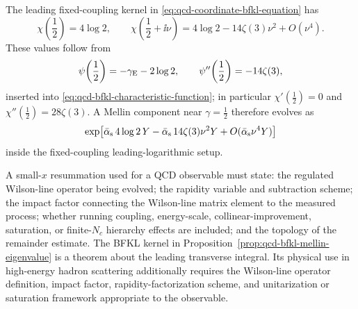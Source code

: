 The leading fixed-coupling kernel in
\eqref{eq:qcd-coordinate-bfkl-equation} has
\[
  \chi\!\left(\frac12\right)=4\log2,
  \qquad
  \chi\!\left(\frac12+\ii\nu\right)
  =
  4\log2-14\zeta(3)\nu^2+O(\nu^4).
\]
These values follow from
\[
  \psi\!\left(\frac12\right)=-\gamma_{\rm E}-2\log2,
  \qquad
  \psi''\!\left(\frac12\right)=-14\zeta(3),
\]
inserted into \eqref{eq:qcd-bfkl-characteristic-function}; in particular
\(\chi'(\frac12)=0\) and \(\chi''(\frac12)=28\zeta(3)\).  A Mellin component
near \(\gamma=\frac12\) therefore evolves as
\[
  \exp\!\left[
    \bar\alpha_{\rm s}\,4\log2\,Y
    -\bar\alpha_{\rm s}\,14\zeta(3)\nu^2Y
    +O(\bar\alpha_{\rm s}\nu^4Y)
  \right]
\]
inside the fixed-coupling leading-logarithmic setup.

\begin{remark}
\label{ca:qcd-small-x-status}
A small-\(x\) resummation used for a QCD observable must state:
the regulated Wilson-line operator being evolved; the rapidity variable and
subtraction scheme; the impact factor connecting the Wilson-line matrix
element to the measured process; whether running coupling, energy-scale,
collinear-improvement, saturation, or finite-\(N_c\) hierarchy effects are
included; and the topology of the remainder estimate.  The BFKL kernel in
Proposition~\ref{prop:qcd-bfkl-mellin-eigenvalue} is a theorem about the
leading transverse integral.  Its physical use in high-energy hadron
scattering additionally requires the Wilson-line operator definition, impact
factor, rapidity-factorization scheme, and unitarization or saturation
framework appropriate to the observable.
\end{remark}
